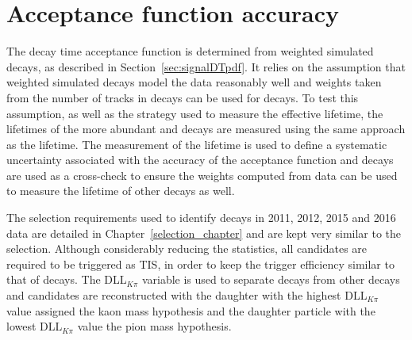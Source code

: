 \section{Acceptance function accuracy}
\label{sec:accptsyst}
The \bsmumu decay time acceptance function is determined from weighted simulated decays, as described in Section~\ref{sec:signalDTpdf}. It relies on the assumption that weighted simulated decays model the data reasonably well and weights taken from the number of tracks in \bdkpi decays can be used for \bsmumu decays. To test this assumption, as well as the strategy used to measure the \bsmumu effective lifetime, the lifetimes of the more abundant \bdkpi and \bskk decays are measured using the same approach as the \bsmumu lifetime.
The measurement of the \bdkpi lifetime is used to define a systematic uncertainty associated with the accuracy of the acceptance function and \bskk decays are used as a cross-check to ensure the weights computed from \bdkpi data can be used to measure the lifetime of other decays as well.



The selection requirements used to identify \bdkpi decays in 2011, 2012, 2015 and 2016 data are detailed in Chapter~\ref{selection_chapter} and are kept very similar to the \bsmumu selection. Although considerably reducing the statistics, all candidates are required to be triggered as TIS, in order to keep the \bhh trigger efficiency similar to that of \bsmumu decays. %
The DLL$_{K\pi}$ variable is used to separate \bdkpi decays from other \bhh decays and candidates are reconstructed with the daughter with the highest DLL$_{K\pi}$ value assigned the kaon mass hypothesis and the daughter particle with the lowest DLL$_{K\pi}$ value the pion mass hypothesis.

